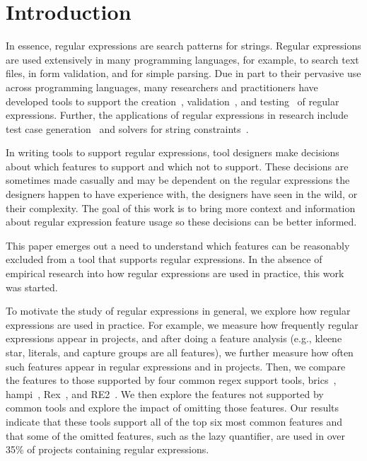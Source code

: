 \section{Introduction}

 In essence, regular expressions are search patterns for strings. Regular expressions are used extensively in many programming languages, for example, to search text files, in form validation, and for simple parsing. Due in part to their pervasive use across programming languages, many researchers and practitioners have developed tools to support the creation~\cite{}, validation~\cite{}, and testing~\cite{} of regular expressions. Further, the applications of regular expressions in research  include test case generation~\cite{Ghosh:2013:JAT:2486788.2486925, Galler:2014:STD:2683035.2683100} and solvers for string constraints~\cite{Trinh:2014:SSS:2660267.2660372, hampi}.

 In writing tools to support regular expressions, tool designers make decisions about which features to support and which not to support. These decisions are sometimes made casually and may be dependent on the regular expressions the designers happen to have experience with, the designers have seen in the wild, or their complexity. The goal of this work is to bring more context and information about regular expression feature usage so these decisions can be better informed.

This paper emerges out a need to understand which features can be reasonably excluded from a tool that supports regular expressions. In the absence of empirical research into how regular expressions are used in practice, this work was started.

To motivate the study of regular expressions in general, we explore how regular expressions are used in practice. For example, we measure how frequently regular expressions appear in projects, and after doing a feature analysis (e.g., kleene star, literals, and capture groups are all features), we further measure how often such features appear in regular expressions and in projects. Then, we compare the features to those supported by four common regex support tools, brics~\cite{brics}, hampi~\cite{hampi}, Rex~\cite{rex}, and RE2~\cite{re2}. We then explore the features not supported by common tools and explore the impact of omitting those features. Our results indicate that these tools support all of the top six most common features and that some of the omitted features, such as the lazy quantifier, are used in over 35\% of projects containing regular expressions.

